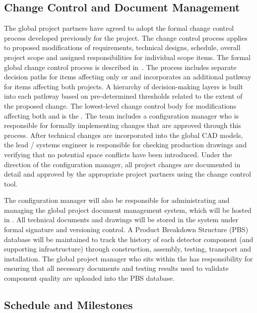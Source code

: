 \subsection{Change Control and Document Management}
\label{sec:dune_changecontrol}

The global project partners have agreed to adopt the formal change
control process developed previously for the  project.
The change control process applies to proposed modifications of
requirements, technical designs, schedule, overall project scope and
assigned responsibilities for individual scope items.  The formal
global change control process is described in~. %
The process includes separate decision paths for items affecting only
 or  and incorporates an additional pathway
for items affecting both projects.  A hierarchy of decision-making
layers is built into each pathway based on pre-determined thresholds
related to the extent of the proposed change.  The lowest-level change
control body for modifications affecting both  and
 is the .  The  team includes a
configuration manager who is responsible for formally implementing
changes that are approved through this process.  After technical
changes are incorporated into the global \threed CAD models, the lead
/ systems engineer is responsible for checking production
drawings and verifying that no potential space conflicts have been
introduced.  Under the direction of the configuration manager, all
project changes are documented in detail and approved %
by the
appropriate project partners using the  change control tool.

The configuration manager will also be responsible for administrating
and managing the global project document management system, which will
be hosted in .  All technical documents and drawings will be
stored in the  system under formal signature and
versioning control.  A Product Breakdown Structure (PBS) database will
be maintained to track the history of each detector  component (and supporting
infrastructure) through construction, assembly, testing, %
transport and installation.  The global project  manager who
sits within the  has responsibility for ensuring that all
necessary documents and testing results used to validate component
quality are uploaded into the PBS database.

\subsection{Schedule and Milestones}
\label{sec:dune_schedule}

